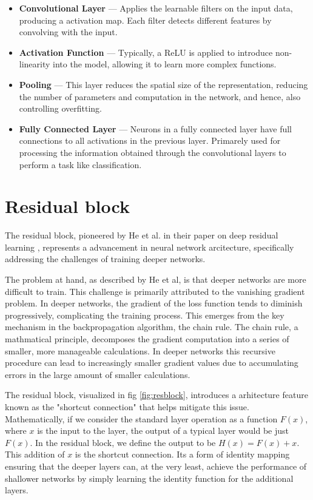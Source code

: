 \begin{itemize}
    \item \textbf{Convolutional Layer} — Applies the learnable filters on the input data, producing a activation map. Each filter detects different features by convolving with the input.
    \item \textbf{Activation Function} — Typically, a ReLU is applied to introduce non-linearity into the model, allowing it to learn more complex functions.
    \item \textbf{Pooling} — This layer reduces the spatial size of the representation, reducing the number of parameters and computation in the network, and hence, also controlling overfitting. 
    \item \textbf{Fully Connected Layer} — Neurons in a fully connected layer have full connections to all activations in the previous layer. Primarely used for processing the information obtained through the convolutional layers to perform a task like classification.
\end{itemize}

\section{Residual block}
The residual block, pioneered by He et al. in their paper on deep residual learning \cite{ResLearn}, represents a advancement in neural network arcitecture, 
specifically addressing the challenges of training deeper networks.

The problem at hand, as described by He et al, is that deeper networks are more difficult to train. This challenge is primarily attributed to the vanishing gradient problem.
In deeper networks, the gradient of the loss function tends to diminish progressively, complicating the training process. 
This emerges from the key mechanism in the backpropagation algorithm, the chain rule. The chain rule, a mathmatical principle, decomposes the gradient computation into a series of smaller,
more manageable calculations. In deeper networks this recursive procedure can lead to increasingly smaller gradient values due to accumulating errors in the large amount of smaller calculations. 

The residual block, visualized in fig \ref{fig:resblock}, introduces a arhitecture feature known as the "shortcut connection" that helps mitigate this issue.
Mathematically, if we consider the standard layer operation as a function $F(x)$, where $x$ is the input to the layer, the output of a typical layer would be just $F(x)$. In the residual block,
we define the output to be $H(x) = F(x) + x$. This addition of $x$ is the shortcut connection. Its a form of identity mapping ensuring that the deeper layers can, at the very least, achieve the performance of shallower
networks by simply learning the identity function for the additional layers.

